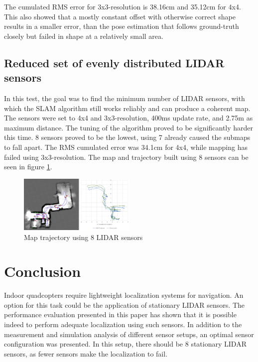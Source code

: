 \documentclass[conference]{IEEEtran}
\begin{document}
The cumulated RMS error for 3x3-resolution is 38.16cm and 35.12cm for 4x4. This also showed that a mostly
constant offset with otherwise correct shape results in a smaller error, than the pose estimation that 
follows ground-truth closely but failed in shape at a relatively small area. 

\subsection{Reduced set of evenly distributed LIDAR sensors}

In this test, the goal was to find the minimum number of LIDAR sensors, with which the SLAM algorithm still 
works reliably and can produce a coherent map. The sensors were set to 4x4 and 3x3-resolution, 400ms update 
rate, and 2.75m as maximum distance. The tuning of the algorithm proved to be significantly harder this time. 
8 sensors proved to be the lowest, using 7 already caused the submaps to fall apart. The RMS cumulated error 
was 34.1cm for 4x4, while mapping has failed using 3x3-resolution. The map and trajectory built using 8 sensors
can be seen in figure \ref{fig_8_sensors}.

\begin{figure}[!t]
  \centering
  \includegraphics[width=0.5\textwidth]{08_map_8sensor_4x4.png}
  \caption{Map trajectory using 8 LIDAR sensors}
  \label{fig_8_sensors}
  \end{figure}

\section{Conclusion}
Indoor quadcopters require lightweight localization systems for navigation. An option for this task could be the application of stationary LIDAR sensors. The performance evaluation presented in this paper has shown that it is possible indeed to perform adequate localization using such sensors. In addition to the measurement and simulation analysis of different sensor setups, an optimal sensor configuration was presented. In this setup, there should be 8 stationary LIDAR sensors, as fewer sensors make the localization to fail.
\end{document}
